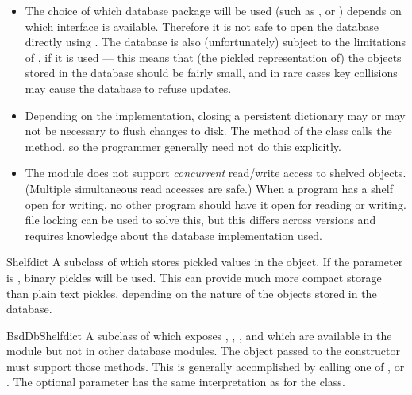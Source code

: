 \begin{itemize}

\item
The choice of which database package will be used
(such as ,  or ) depends on
which interface is available.  Therefore it is not safe to open the database
directly using .  The database is also (unfortunately) subject
to the limitations of , if it is used --- this means
that (the pickled representation of) the objects stored in the
database should be fairly small, and in rare cases key collisions may
cause the database to refuse updates.

\item
Depending on the implementation, closing a persistent dictionary may
or may not be necessary to flush changes to disk.  The 
method of the  class calls the  method, so the
programmer generally need not do this explicitly.

\item
The  module does not support \emph{concurrent} read/write
access to shelved objects.  (Multiple simultaneous read accesses are
safe.)  When a program has a shelf open for writing, no other program
should have it open for reading or writing.  \UNIX{} file locking can
be used to solve this, but this differs across \UNIX{} versions and
requires knowledge about the database implementation used.

\end{itemize}

\begin{classdesc}{Shelf}{dict}
A subclass of  which stores pickled values in the
 object.  If the  parameter is , binary
pickles will be used.  This can provide much more compact storage than plain
text pickles, depending on the nature of the objects stored in the database.
\end{classdesc}

\begin{classdesc}{BsdDbShelf}{dict}
A subclass of  which exposes , ,
,  and  which are
available in the  module but not in other database modules.
The  object passed to the constructor must support those methods.
This is generally accomplished by calling one of ,
 or .  The optional
 parameter has the same interpretation as for the 
class. 
\end{classdesc}

